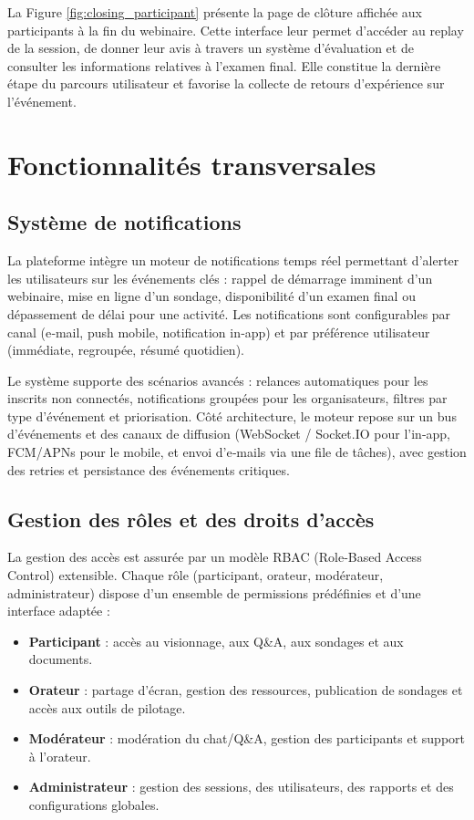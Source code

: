 La Figure \ref{fig:closing_participant} présente la page de clôture affichée aux participants à la fin du webinaire. Cette interface leur permet d’accéder au replay de la session, de donner leur avis à travers un système d’évaluation et de consulter les informations relatives à l’examen final. Elle constitue la dernière étape du parcours utilisateur et favorise la collecte de retours d’expérience sur l’événement.

\section{Fonctionnalités transversales}

\subsection{Système de notifications}

La plateforme intègre un moteur de notifications temps réel permettant d'alerter les utilisateurs sur les événements clés : rappel de démarrage imminent d'un webinaire, mise en ligne d'un sondage, disponibilité d'un examen final ou dépassement de délai pour une activité. Les notifications sont configurables par canal (e‑mail, push mobile, notification in‑app) et par préférence utilisateur (immédiate, regroupée, résumé quotidien).

Le système supporte des scénarios avancés : relances automatiques pour les inscrits non connectés, notifications groupées pour les organisateurs, filtres par type d'événement et priorisation. Côté architecture, le moteur repose sur un bus d'événements et des canaux de diffusion (WebSocket / Socket.IO pour l'in‑app, FCM/APNs pour le mobile, et envoi d'e‑mails via une file de tâches), avec gestion des retries et persistance des événements critiques.

\subsection{Gestion des rôles et des droits d'accès}

La gestion des accès est assurée par un modèle RBAC (Role‑Based Access Control) extensible. Chaque rôle (participant, orateur, modérateur, administrateur) dispose d'un ensemble de permissions prédéfinies et d'une interface adaptée :

\begin{itemize}
    \item \textbf{Participant} : accès au visionnage, aux Q\&A, aux sondages et aux documents.
    \item \textbf{Orateur} : partage d'écran, gestion des ressources, publication de sondages et accès aux outils de pilotage.
    \item \textbf{Modérateur} : modération du chat/Q\&A, gestion des participants et support à l'orateur.
    \item \textbf{Administrateur} : gestion des sessions, des utilisateurs, des rapports et des configurations globales.
\end{itemize}

